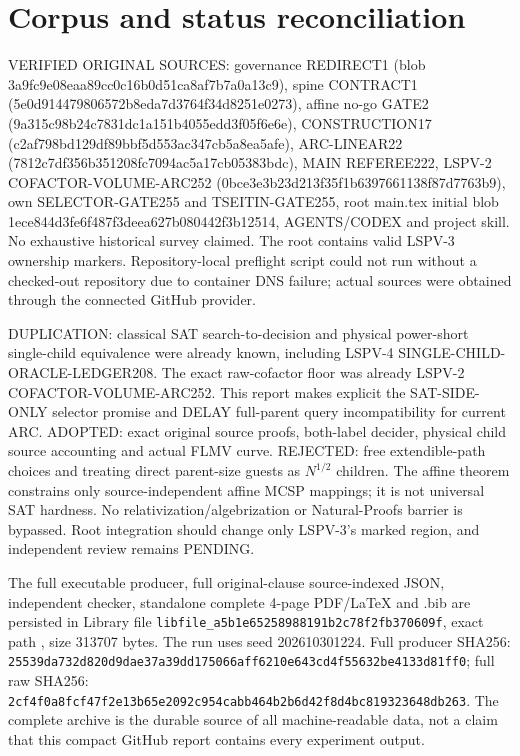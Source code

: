 \documentclass[11pt]{article}
\begin{document}
\section{Corpus and status reconciliation}
VERIFIED ORIGINAL SOURCES: governance REDIRECT1 (blob 3a9fc9e08eaa89cc0c16b0d51ca8af7b7a0a13c9), spine CONTRACT1 (5e0d914479806572b8eda7d3764f34d8251e0273), affine no-go GATE2 (9a315c98b24c7831dc1a151b4055edd3f05f6e6e), CONSTRUCTION17 (c2af798bd129df89bbf5d553ac347cb5a8ea5afe), ARC-LINEAR22 (7812c7df356b351208fc7094ac5a17cb05383bdc), MAIN REFEREE222, LSPV-2 COFACTOR-VOLUME-ARC252 (0bce3e3b23d213f35f1b6397661138f87d7763b9), own SELECTOR-GATE255 and TSEITIN-GATE255, root main.tex initial blob 1ece844d3fe6f487f3deea627b080442f3b12514, AGENTS/CODEX and project skill. No exhaustive historical survey claimed. The root contains valid LSPV-3 ownership markers. Repository-local preflight script could not run without a checked-out repository due to container DNS failure; actual sources were obtained through the connected GitHub provider.

DUPLICATION: classical SAT search-to-decision and physical power-short single-child equivalence were already known, including LSPV-4 SINGLE-CHILD-ORACLE-LEDGER208. The exact raw-cofactor floor was already LSPV-2 COFACTOR-VOLUME-ARC252. This report makes explicit the SAT-SIDE-ONLY selector promise and DELAY full-parent query incompatibility for current ARC. ADOPTED: exact original source proofs, both-label decider, physical child source accounting and actual FLMV curve. REJECTED: free extendible-path choices and treating direct parent-size guests as $N^{1/2}$ children. The affine theorem constrains only source-independent affine MCSP mappings; it is not universal SAT hardness. No relativization/algebrization or Natural-Proofs barrier is bypassed. Root integration should change only LSPV-3's marked region, and independent review remains PENDING.

The full executable producer, full original-clause source-indexed JSON, independent checker, standalone complete 4-page PDF/LaTeX and .bib are persisted in Library file \texttt{libfile\_a5b1e65258988191b2c78f2fb370609f}, exact path , size 313707 bytes. The run uses seed 202610301224. Full producer SHA256: \texttt{25539da732d820d9dae37a39dd175066aff6210e643cd4f55632be4133d81ff0}; full raw SHA256: \texttt{2cf4f0a8fcf47f2e13b65e2092c954cabb464b2b6d42f8d4bc819323648db263}. The complete archive is the durable source of all machine-readable data, not a claim that this compact GitHub report contains every experiment output.
\end{document}
